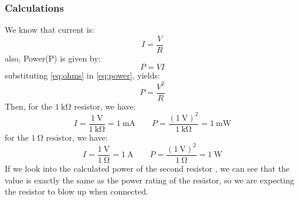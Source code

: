 \documentclass[a4paper]{article}
\begin{document}
\subsubsection{Calculations}
We know that current is:
\begin{equation}I=\frac{V}{R}\label{eq:ohms}\end{equation}
also, Power(P) is given by: 
\begin{equation}P=VI\label{eq:power}\end{equation}
substituting \ref{eq:ohms} in \ref{eq:power}, yields:
\begin{equation}P=\frac{V^2}{R}\label{eq:power2}\end{equation}
Then, for the $\SI{1}{\kilo\ohm}$ resistor, we have:
\[I=\frac{\SI{1}{\volt}}{\SI{1}{\kilo\ohm}}=\SI{1}{\milli\ampere}
\qquad P=\frac{(\SI{1}{\volt})^2}{\SI{1}{\kilo\ohm}}=\SI{1}{\milli\watt}\]
for the $\SI{1}{\ohm}$ resistor, we have:
\[I=\frac{\SI{1}{\volt}}{\SI{1}{\ohm}}=\SI{1}{\ampere}
\qquad P=\frac{(\SI{1}{\volt})^2}{\SI{1}{\ohm}}=\SI{1}{\watt}\]
If we look into the calculated power of the second resistor , we can see that the value is exactly the same
as the power rating of the resistor, so we are expecting the resistor to blow up when connected.
\end{document}
